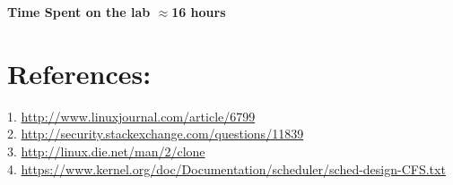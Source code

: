 \documentclass[10pt] {article}
\begin{document}
\noindent \textbf{Time Spent on the lab \ensuremath{\approx}16 hours} 

\section{References:}
1. \url{http://www.linuxjournal.com/article/6799}  \\
2. \url{http://security.stackexchange.com/questions/11839} \\
3. \url{http://linux.die.net/man/2/clone} \\
4. \url{https://www.kernel.org/doc/Documentation/scheduler/sched-design-CFS.txt}
\end{document}
